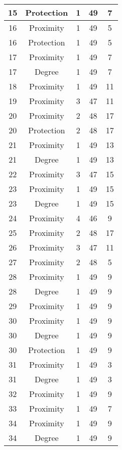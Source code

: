 \documentclass[results.tex]{subfiles}
\begin{document}
\begin{center}
\begin{tabular}{| c || c | c | c | c |}
    \hline
    15 & Protection & 1 & 49 & 7 \\ 
    \hline
    16 & Proximity & 1 & 49 & 5 \\ 
    \hline
    16 & Protection & 1 & 49 & 5 \\ 
    \hline
    17 & Proximity & 1 & 49 & 7 \\ 
    \hline
    17 & Degree & 1 & 49 & 7 \\ 
    \hline
    18 & Proximity & 1 & 49 & 11 \\ 
    \hline
    19 & Proximity & 3 & 47 & 11 \\ 
    \hline
    20 & Proximity & 2 & 48 & 17 \\ 
    \hline
    20 & Protection & 2 & 48 & 17 \\ 
    \hline
    21 & Proximity & 1 & 49 & 13 \\ 
    \hline
    21 & Degree & 1 & 49 & 13 \\ 
    \hline
    22 & Proximity & 3 & 47 & 15 \\ 
    \hline
    23 & Proximity & 1 & 49 & 15 \\ 
    \hline
    23 & Degree & 1 & 49 & 15 \\ 
    \hline
    24 & Proximity & 4 & 46 & 9 \\ 
    \hline
    25 & Proximity & 2 & 48 & 17 \\ 
    \hline
    26 & Proximity & 3 & 47 & 11 \\ 
    \hline
    27 & Proximity & 2 & 48 & 5 \\ 
    \hline
    28 & Proximity & 1 & 49 & 9 \\ 
    \hline
    28 & Degree & 1 & 49 & 9 \\ 
    \hline
    29 & Proximity & 1 & 49 & 9 \\ 
    \hline
    30 & Proximity & 1 & 49 & 9 \\ 
    \hline
    30 & Degree & 1 & 49 & 9 \\ 
    \hline
    30 & Protection & 1 & 49 & 9 \\ 
    \hline
    31 & Proximity & 1 & 49 & 3 \\ 
    \hline
    31 & Degree & 1 & 49 & 3 \\ 
    \hline
    32 & Proximity & 1 & 49 & 9 \\ 
    \hline
    33 & Proximity & 1 & 49 & 7 \\ 
    \hline
    34 & Proximity & 1 & 49 & 9 \\ 
    \hline
    34 & Degree & 1 & 49 & 9 \\ 

\end{tabular}
\end{center}
\end{document}
